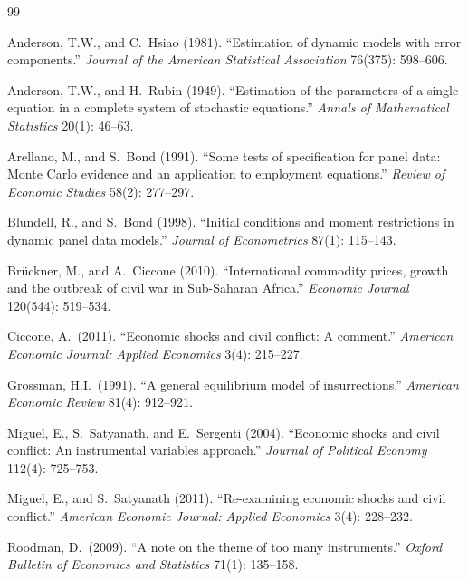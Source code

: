 \documentclass[11pt,a4paper]{article}
\begin{document}
\newpage
\renewcommand{\refname}{References}
\begin{thebibliography}{99}\small

Anderson, T.W., and C.\ Hsiao (1981). ``Estimation of dynamic models
  with error components.'' \emph{Journal of the American Statistical
  Association} 76(375): 598--606.

Anderson, T.W., and H.\ Rubin (1949). ``Estimation of the parameters
  of a single equation in a complete system of stochastic equations.''
  \emph{Annals of Mathematical Statistics} 20(1): 46--63.

Arellano, M., and S.\ Bond (1991). ``Some tests of specification for
  panel data: Monte Carlo evidence and an application to employment
  equations.'' \emph{Review of Economic Studies} 58(2): 277--297.

Blundell, R., and S.\ Bond (1998). ``Initial conditions and moment
  restrictions in dynamic panel data models.''
  \emph{Journal of Econometrics} 87(1): 115--143.

Br\"uckner, M., and A.\ Ciccone (2010). ``International commodity
  prices, growth and the outbreak of civil war in Sub-Saharan Africa.''
  \emph{Economic Journal} 120(544): 519--534.

Ciccone, A.\ (2011). ``Economic shocks and civil conflict: A
  comment.'' \emph{American Economic Journal: Applied Economics}
  3(4): 215--227.

Grossman, H.I.\ (1991). ``A general equilibrium model of
  insurrections.'' \emph{American Economic Review} 81(4): 912--921.

Miguel, E., S.\ Satyanath, and E.\ Sergenti (2004). ``Economic
  shocks and civil conflict: An instrumental variables approach.''
  \emph{Journal of Political Economy} 112(4): 725--753.

Miguel, E., and S.\ Satyanath (2011). ``Re-examining economic shocks
  and civil conflict.'' \emph{American Economic Journal: Applied
  Economics} 3(4): 228--232.

Roodman, D.\ (2009). ``A note on the theme of too many instruments.''
  \emph{Oxford Bulletin of Economics and Statistics} 71(1): 135--158.


\end{thebibliography}
\end{document}
